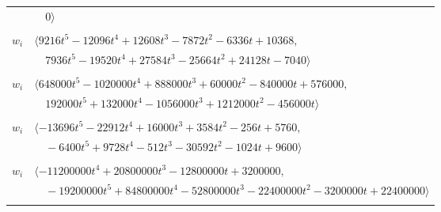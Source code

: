 \documentclass[11pt]{article}
\begin{document}
\begin{longtable}{@{}ll@{}}
 & $\quad 0\rangle$\\
\addlinespace[2pt]
\multicolumn{2}{@{}p{0.97\textwidth}@{}}{$i=42$, $D_i=2$, $e_i=3$, $\rho_{ij}$: $10{:}2, \allowbreak 12{:}3, \allowbreak 14{:}1, \allowbreak 19{:}3, \allowbreak 25{:}1, \allowbreak 37{:}1, \allowbreak 49{:}3, \allowbreak 55{:}2, \allowbreak 59{:}3, \allowbreak 68{:}3, \allowbreak 70{:}1$}\\
$w_i$ & $\langle 9216t^{5}-12096t^{4}+12608t^{3}-7872t^{2}-6336t+10368,$\\
 & $\quad 7936t^{5}-19520t^{4}+27584t^{3}-25664t^{2}+24128t-7040\rangle$\\
\addlinespace[2pt]
\multicolumn{2}{@{}p{0.97\textwidth}@{}}{$i=43$, $D_i=250$, $e_i=2$, $\rho_{ij}$: $8{:}2, \allowbreak 13{:}2, \allowbreak 22{:}2, \allowbreak 24{:}2, \allowbreak 26{:}2, \allowbreak 29{:}2, \allowbreak 47{:}2, \allowbreak 62{:}2, \allowbreak 70{:}2$}\\
$w_i$ & $\langle 648000t^{5}-1020000t^{4}+888000t^{3}+60000t^{2}-840000t+576000,$\\
 & $\quad 192000t^{5}+132000t^{4}-1056000t^{3}+1212000t^{2}-456000t\rangle$\\
\addlinespace[2pt]
\multicolumn{2}{@{}p{0.97\textwidth}@{}}{$i=44$, $D_i=4$, $e_i=1$, $\rho_{ij}$: $1{:}2, \allowbreak 2{:}1, \allowbreak 3{:}2, \allowbreak 4{:}1, \allowbreak 16{:}1, \allowbreak 31{:}2, \allowbreak 36{:}1, \allowbreak 53{:}1, \allowbreak 54{:}1, \allowbreak 56{:}1, \allowbreak 58{:}2, \allowbreak 59{:}2, \allowbreak 61{:}3, \allowbreak 63{:}3, \allowbreak 67{:}2, \allowbreak 73{:}3, \allowbreak 77{:}2$}\\
$w_i$ & $\langle -13696t^{5}-22912t^{4}+16000t^{3}+3584t^{2}-256t+5760,$\\
 & $\quad -6400t^{5}+9728t^{4}-512t^{3}-30592t^{2}-1024t+9600\rangle$\\
\addlinespace[2pt]
\multicolumn{2}{@{}p{0.97\textwidth}@{}}{$i=45$, $D_i=100000$, $e_i=1$, $\rho_{ij}$: $0{:}1, \allowbreak 2{:}1, \allowbreak 14{:}1, \allowbreak 18{:}1, \allowbreak 29{:}2, \allowbreak 31{:}3, \allowbreak 38{:}3, \allowbreak 40{:}2, \allowbreak 55{:}1, \allowbreak 59{:}3, \allowbreak 61{:}1, \allowbreak 64{:}3, \allowbreak 70{:}1, \allowbreak 77{:}2$}\\
$w_i$ & $\langle -11200000t^{4}+20800000t^{3}-12800000t+3200000,$\\
 & $\quad -19200000t^{5}+84800000t^{4}-52800000t^{3}-22400000t^{2}-3200000t+22400000\rangle$\\
\addlinespace[2pt]
\multicolumn{2}{@{}p{0.97\textwidth}@{}}{$i=46$, $D_i=128$, $e_i=1$, $\rho_{ij}$: $5{:}3, \allowbreak 6{:}1, \allowbreak 7{:}1, \allowbreak 11{:}3, \allowbreak 14{:}3, \allowbreak 16{:}3, \allowbreak 23{:}1, \allowbreak 25{:}1, \allowbreak 26{:}3, \allowbreak 34{:}1, \allowbreak 58{:}1, \allowbreak 63{:}3, \allowbreak 64{:}3, \allowbreak 71{:}1$}\\

\end{longtable}
\end{document}

